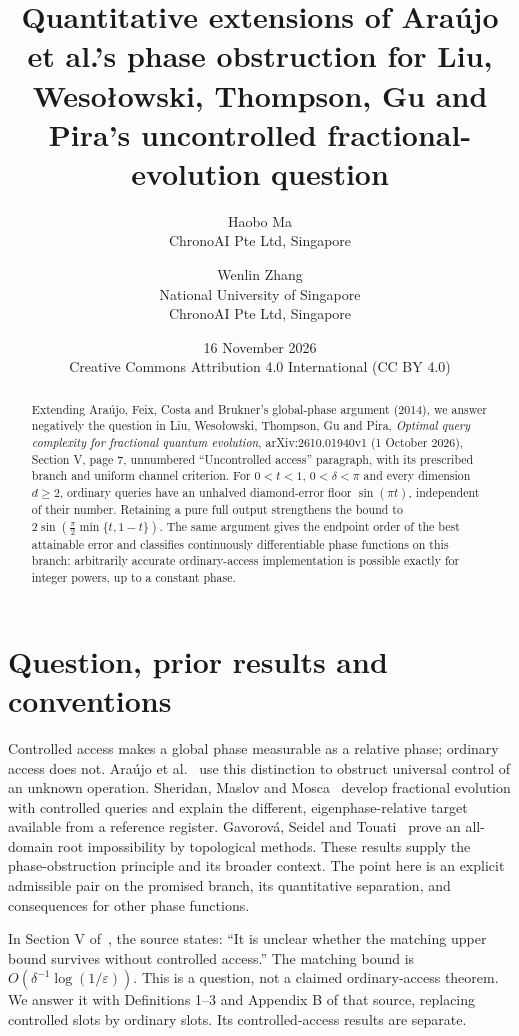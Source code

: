 \documentclass[11pt]{article}
\title{Quantitative extensions of Ara\'ujo et al.'s phase obstruction
for Liu, Weso\l{}owski, Thompson, Gu and Pira's
uncontrolled fractional-evolution question}
\author{Haobo Ma\\
\small ChronoAI Pte Ltd, Singapore
\and Wenlin Zhang\\
\small National University of Singapore\\
\small ChronoAI Pte Ltd, Singapore}
\date{16 November 2026\\[3pt]
\small Creative Commons Attribution 4.0 International (CC BY 4.0)}
\begin{document}
\maketitle
\begin{abstract}
Extending Ara\'ujo, Feix, Costa and Brukner's global-phase argument
(2014), we answer negatively the question in Liu, Weso\l{}owski, Thompson,
Gu and Pira, \emph{Optimal query complexity for fractional quantum evolution},
arXiv:2610.01940v1 (1 October 2026), Section V, page 7, unnumbered
``Uncontrolled access'' paragraph, with its prescribed branch and uniform
channel criterion.
For $0<t<1$, $0<\delta<\pi$ and every dimension $d\geq2$, ordinary
queries have an unhalved diamond-error floor $\sin(\pi t)$, independent
of their number. Retaining a pure full output strengthens the bound to
$2\sin(\frac\pi2\min\{t,1-t\})$.
The same argument gives the endpoint order of the best attainable error
and classifies continuously differentiable phase functions on this branch:
arbitrarily accurate ordinary-access implementation is possible exactly
for integer powers, up to a constant phase.
\end{abstract}

\section{Question, prior results and conventions}
Controlled access makes a global phase measurable as a relative phase;
ordinary access does not. Ara\'ujo et al.~\cite[p.~2]{araujo} use this
distinction to obstruct universal control of an unknown operation.
Sheridan, Maslov and Mosca~\cite[Section II.A and Appendix A]{sheridan}
develop fractional evolution with controlled queries and explain the
different, eigenphase-relative target available from a reference register.
Gavorov\'a, Seidel and Touati~\cite[Section IV.C, Corollary 1]{gavorova}
prove an all-domain root impossibility by topological methods.
These results supply the phase-obstruction principle and its broader context.
The point here is an explicit admissible pair on the promised branch,
its quantitative separation, and consequences for other phase functions.

In Section V of~\cite{liu}, the source states:
``It is unclear whether the matching upper bound survives without controlled
access.'' The matching bound is $O(\delta^{-1}\log(1/\varepsilon))$.
This is a question, not a claimed ordinary-access theorem. We answer it with
Definitions 1--3 and Appendix B of that source, replacing controlled slots
by ordinary slots. Its controlled-access results are separate.
\end{document}
